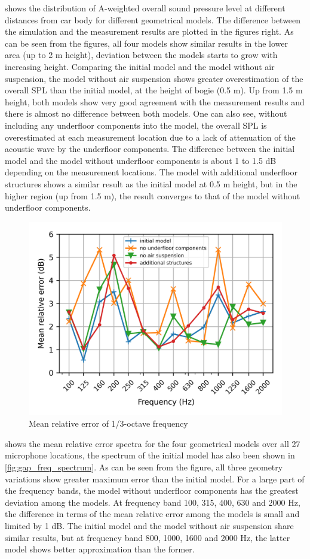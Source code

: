 \noindent{} shows the distribution of  A-weighted overall sound pressure level at different distances from car body for different geometrical models. The difference between the simulation and the measurement results are plotted in the figures right. As can be seen from the figures, all four models show similar results in the lower area (up to 2 m height), deviation between the models starts to grow with increasing height. Comparing the initial model and the model without air suspension, the model without air suspension shows greater overestimation of the overall SPL than the initial model, at the height of bogie (0.5 m). Up from 1.5 m height, both models show very good agreement with the measurement results and there is almost no difference between both models. One can also see, without including any underfloor components into the model, the overall SPL is overestimated at each measurement location due to a lack of attenuation of the acoustic wave by the underfloor components. The difference between the initial model and the model without underfloor components is about 1 to 1.5 dB depending on the measurement locations. The model with additional underfloor structures shows a similar result as the initial model at 0.5 m height, but in the higher region (up from 1.5 m), the result converges to that of the model without underfloor components.

\begin{figure}[H]
	\centering
	\includegraphics[width=0.7\linewidth]{fig/chap5/geometry_variation/freq_spectrum/average_gap.png}
	\caption{Mean relative error of 1/3-octave frequency}
	\label{fig:gap_freq_spectrum_geometry}
\end{figure}

\noindent{} shows the mean relative error spectra for the four geometrical models over all 27 microphone locations, the spectrum of the initial model has also been shown in \cref{fig:gap_freq_spectrum}. As can be seen from the figure, all three geometry variations show greater maximum error than the initial model. For a large part of the frequency bands, the model without underfloor components has the greatest deviation among the models. At frequency band 100, 315, 400, 630 and 2000 Hz, the difference in terms of the mean relative error among the models is small and limited by 1 dB. The initial model and the model without air suspension share similar results, but at frequency band 800, 1000, 1600 and 2000 Hz, the latter model shows better approximation than the former.

